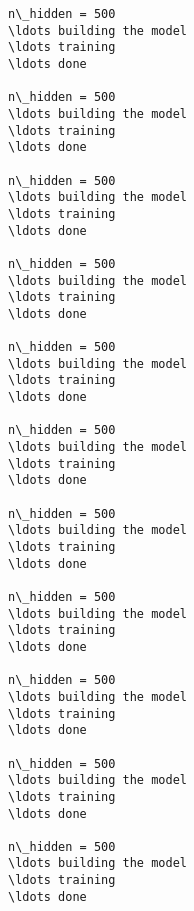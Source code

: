 \documentclass{article}
\begin{document}
    \begin{Verbatim}[commandchars=\\\{\}]
n\_hidden = 500
\ldots building the model
\ldots training
\ldots done

n\_hidden = 500
\ldots building the model
\ldots training
\ldots done

n\_hidden = 500
\ldots building the model
\ldots training
\ldots done

n\_hidden = 500
\ldots building the model
\ldots training
\ldots done

n\_hidden = 500
\ldots building the model
\ldots training
\ldots done

n\_hidden = 500
\ldots building the model
\ldots training
\ldots done

n\_hidden = 500
\ldots building the model
\ldots training
\ldots done

n\_hidden = 500
\ldots building the model
\ldots training
\ldots done

n\_hidden = 500
\ldots building the model
\ldots training
\ldots done

n\_hidden = 500
\ldots building the model
\ldots training
\ldots done

n\_hidden = 500
\ldots building the model
\ldots training
\ldots done
    \end{Verbatim}
\end{document}
